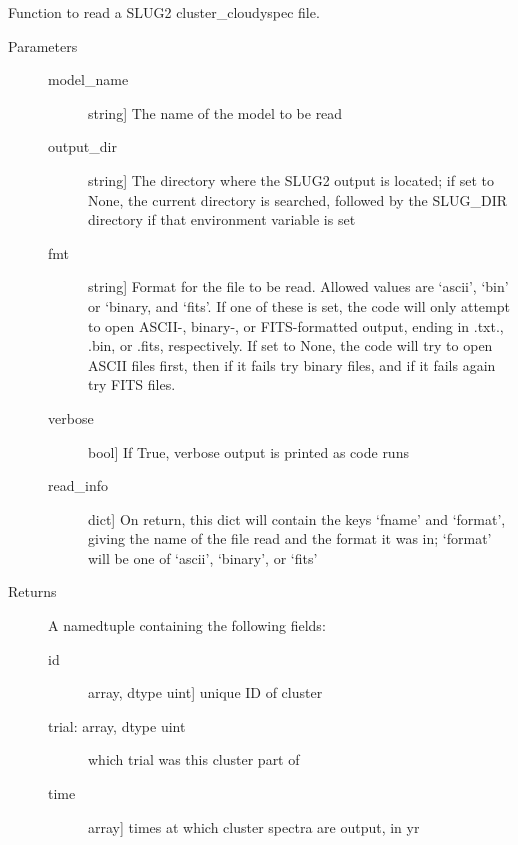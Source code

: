 \documentclass[letterpaper,10pt,english]{sphinxmanual}
\begin{document}
\begin{fulllineitems}
\label{cloudy:slugpy.cloudy.read_cluster_cloudyspec}
Function to read a SLUG2 cluster\_cloudyspec file.
\begin{description}
\item[{Parameters}] \leavevmode\begin{description}
\item[{model\_name}] \leavevmode{[}string{]}
The name of the model to be read

\item[{output\_dir}] \leavevmode{[}string{]}
The directory where the SLUG2 output is located; if set to None,
the current directory is searched, followed by the SLUG\_DIR
directory if that environment variable is set

\item[{fmt}] \leavevmode{[}string{]}
Format for the file to be read. Allowed values are `ascii',
`bin' or `binary, and `fits'. If one of these is set, the code
will only attempt to open ASCII-, binary-, or FITS-formatted
output, ending in .txt., .bin, or .fits, respectively. If set
to None, the code will try to open ASCII files first, then if
it fails try binary files, and if it fails again try FITS
files.

\item[{verbose}] \leavevmode{[}bool{]}
If True, verbose output is printed as code runs

\item[{read\_info}] \leavevmode{[}dict{]}
On return, this dict will contain the keys `fname' and
`format', giving the name of the file read and the format it
was in; `format' will be one of `ascii', `binary', or `fits'

\end{description}

\item[{Returns}] \leavevmode
A namedtuple containing the following fields:
\begin{description}
\item[{id}] \leavevmode{[}array, dtype uint{]}
unique ID of cluster

\item[{trial: array, dtype uint}] \leavevmode
which trial was this cluster part of

\item[{time}] \leavevmode{[}array{]}
times at which cluster spectra are output, in yr


\end{description}
\end{description}
\end{fulllineitems}
\end{document}
